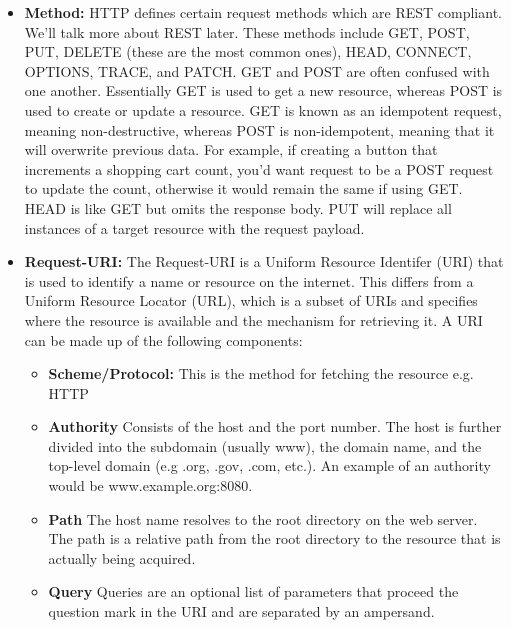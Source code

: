 \documentclass{article}
\begin{document}
\begin{itemize}

\item{%
   \textbf{Method:} HTTP defines certain request methods which are REST compliant. We'll talk more
   about REST later. These methods include GET, POST, PUT, DELETE (these are the most common ones), HEAD,
   CONNECT, OPTIONS, TRACE, and PATCH. GET and POST are often confused with one another. Essentially GET is
   used to get a new resource, whereas POST is used to create or update a resource. GET is known as an
   idempotent request, meaning non-destructive, whereas POST is non-idempotent, meaning that it will
   overwrite previous data. For example, if creating a button that increments a shopping cart count, you'd
   want request to be a POST request to update the count, otherwise it would remain the same if using GET.
   HEAD is like GET but omits the response body. PUT will replace all instances of a target resource with
   the request payload.
}

\item{%
   \textbf{Request-URI:} The Request-URI is a Uniform Resource Identifer (URI) that is used to
   identify a name or resource on the internet. This differs from a Uniform Resource Locator (URL), which is a
   subset of URIs and specifies where the resource is available and the mechanism for retrieving it. A URI can
   be made up of the following components:

   \begin{itemize}

   \item{%
      \textbf{Scheme/Protocol:} This is the method for fetching the resource e.g. HTTP
   }

   \item{%
      \textbf{Authority} Consists of the host and the port number. The host is further divided
      into the subdomain (usually www), the domain name, and the top-level domain
      (e.g .org, .gov, .com, etc.). An example of an authority would be www.example.org:8080.
   }

   \item{%
      \textbf{Path} The host name resolves to the root directory on the web server. The path is a
      relative path from the root directory to the resource that is actually being acquired.
   }

   \item{%
      \textbf{Query} Queries are an optional list of parameters that proceed the question mark in
      the URI and are separated by an ampersand.
   }


\end{itemize}}
\end{itemize}
\end{document}
